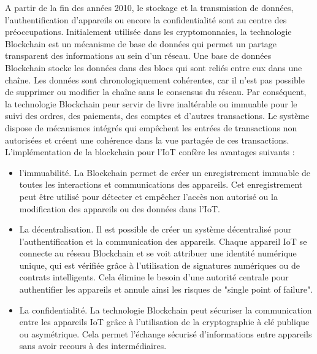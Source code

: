 A partir de la fin des années 2010, le stockage et la transmission de données, l'authentification d'appareils ou encore la confidentialité sont au centre des préoc\-cupations. Initialement utilisée dans les cryptomonnaies, la technologie Blockchain est un mécanisme de base de données qui permet un partage transparent des informations au sein d'un réseau. Une base de données Blockchain stocke les données dans des blocs qui sont reliés entre eux dans une chaîne. Les données sont chronologiquement cohérentes, car il n'est pas possible de supprimer ou modifier la chaîne sans le consensus du réseau. Par conséquent, la technologie Blockchain peur servir de livre inaltérable ou immuable pour le suivi des ordres, des paiements, des comptes et d'autres transactions. Le système dispose de mécanismes intégrés qui empêchent les entrées de transactions non autorisées et créent une cohérence dans la vue partagée de ces transactions. L'implémentation de la blockchain pour l'\ac{IoT} confère les avantages suivants\cite{block} : 
\begin{itemize}
\item l'immuabilité. La Blockchain permet de créer un enregistrement immuable de toutes les interactions et communications des appareils. Cet enregistrement peut être utilisé pour détecter et empêcher l'accès non autorisé ou la modification des appareils ou des données dans l'\ac{IoT}.
\item La décentralisation. Il est possible de créer un système décentralisé pour l’authentification et la communication des appareils. Chaque appareil \ac{IoT} se connecte au réseau Blockchain et se voit attribuer une identité numérique unique, qui est vérifiée grâce à l'utilisation de signatures numériques ou de contrats intelligents. Cela élimine le besoin d’une autorité centrale pour authentifier les appareils et annule ainsi les risques de "single point of failure".
\item La confidentialité. La technologie Blockchain peut sécuriser la communication entre les appareils IoT grâce à l'utilisation de la cryptographie à clé publique ou asymétrique. Cela permet l’échange sécurisé d’informations entre appareils sans avoir recours à des intermédiaires.
\end{itemize}

\vspace{0.1cm}

